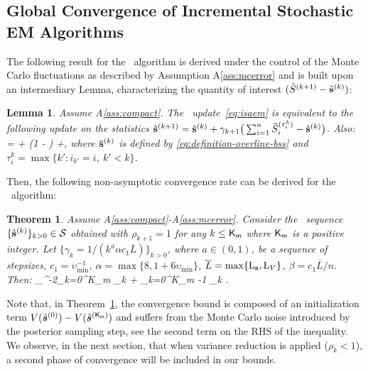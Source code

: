 \documentclass[11pt]{article}
\newtheorem{Lemma}{Lemma}
\newtheorem{Theorem}{Theorem}
\theoremstyle{t}
\begin{document}
\vspace{-0.05in}
\subsection{Global Convergence of Incremental Stochastic EM Algorithms}
\vspace{-0.05in}

The following result for the \ISAEM\ algorithm is derived under the control of the Monte Carlo fluctuations as described by Assumption A\ref{ass:mcerror} and is built upon an intermediary Lemma, characterizing the quantity of interest $( \hat{S}^{(k+1)} - \hat{\bss}^{(k)} )$:
\begin{Lemma}\label{lem:meanfield_isaem}
 Assume A\ref{ass:compact}. The \ISAEM\ update~\eqref{eq:isaem} is equivalent to the following update on the statistics $\hat{\bss}^{(k+1)} =  \hat{\bss}^{(k)}  + \gamma_{k+1} \big(  \sum_{i=1}^n \tilde{S}_i^{(\tau_i^k)} - \hat{\bss}^{(k)} \big)$.
Also:
\beq\notag
{} =  + \left(1 -  \right) \EE\left[\frac{1}{n} \sum_{i=1}^n \tilde{S}_i^{(\tau_i^k)}- \overline{\bss}^{(k)}\right]  +\EE[\eta_{i_k}^{(k+1)}]\eqsp,
\eeq
where $\overline{\bss}^{(k)}$ is defined by \eqref{eq:definition-overline-bss} and $\tau_i^k = \max \{ k' : i_{k'} = i,~k' < k \}$.
\end{Lemma}
Then, the following non-asymptotic convergence rate can be derived for the \ISAEM\ algorithm:
\begin{Theorem}\label{thm:isaem}
Assume A\ref{ass:compact}-A\ref{ass:mcerror}.
Consider the \ISAEM\ sequence $\{\hat{\bss}^{(k)}\}_{k>0} \in \mathcal{S}$ obtained with $\rho_{k+1}=1$ for any $k \leq {\sf K}_{\sf m }$ where ${\sf K}_{\sf m }$ is a positive integer. 
Let $\{\gamma_{k} = 1/(k^a \alpha c_1 \overline{L})\}_{k>0}$, where $a \in (0,1)$, be a sequence of stepsizes, $c_1 = \upsilon_{\min}^{-1}$, $\alpha = \max\{8, 1+6\upsilon_{\min}\}$, $\overline{L} = \max\{ \Lip{\bss} , \Lip{V} \}$, $\beta = c_1 \overline{L}/n$. Then:
\beq\notag
\upsilon_{\max}^{-2}\sum_{k=0}^{{\sf K}_{\sf m }} \tilde{\alpha}_k \EE [\|\grd V( \hs{k} )\|^2]  \leq   \EE  [V( \hs{0} ) - V( \hs{{\sf K}_{\sf m }} ) ] + \sum_{k=0}^{{\sf K}_{\sf m }-1} \tilde{\Gamma}_k         \EE [\| \eta_{i_k}^{(k)}\|^2] \eqs.
\eeq
\end{Theorem} 
Note that, in Theorem~\ref{thm:isaem}, the convergence bound is composed of an initialization term $V( \hs{0} ) - V( \hs{{\sf K}_{\sf m }} )$ and suffers from the Monte Carlo noise introduced by the posterior sampling step, see the second term on the RHS of the inequality. 
We observe, in the next section, that when variance reduction is applied ($\rho_k < 1$), a second phase of convergence will be included in our bounds.
\end{document}

